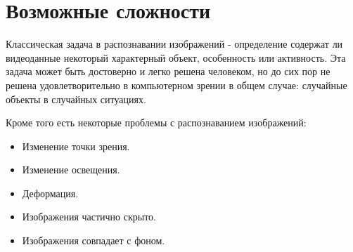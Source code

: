 \section{Возможные сложности}

Классическая задача в распознавании изображений - определение содержат ли видеоданные некоторый характерный объект, особенность или активность. Эта задача может быть достоверно и легко решена человеком, но до сих пор не решена удовлетворительно в компьютерном зрении в общем случае: случайные объекты в случайных ситуациях.

Кроме того есть некоторые проблемы с распознаванием изображений:
\begin{itemize}
	\item Изменение точки зрения.
	\item Изменение освещения.
	\item Деформация.
	\item Изображения частично скрыто.
	\item Изображения совпадает с фоном.
\end{itemize}

